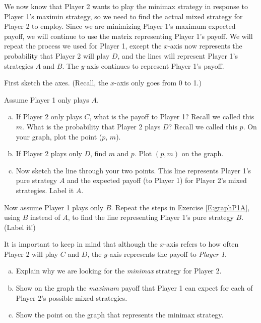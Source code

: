 We now know that Player 2 wants to play the minimax strategy in response to Player 1's maximin strategy, so we need to find the actual mixed strategy for Player 2 to employ. Since we are minimizing Player 1's maximum expected payoff, we will continue to use the matrix representing Player 1's payoff. We will repeat the process we used for Player 1, except the $x$-axis now represents the probability that Player 2 will play $D$, and the lines will represent Player 1's strategies $A$ and $B$. The $y$-axis continues to represent Player 1's payoff. 

\begin{xca}\label{E:graphStep0}
First sketch the axes. (Recall, the $x$-axis only goes from 0 to 1.)
\end{xca}

\begin{xca}\label{E:graphP1A}
Assume Player 1 only plays $A$. 
\begin{enumerate}[(a)]
\item If Player 2 only plays $C$, what is the payoff to Player 1? Recall we called this $m$. What is the probability that Player 2 plays $D$? Recall we called this $p$. On your graph, plot the point ($p$, $m$).

\item If Player 2 plays only $D$, find $m$ and $p$. Plot $(p, m)$ on the graph.

\item Now sketch the line through your two points. This line represents Player 1's pure strategy $A$ and the expected payoff (to Player 1) for Player 2's mixed strategies. Label it $A$.
\end{enumerate}
\end{xca}

\begin{xca}\label{E:graphP1B}
Now assume Player 1 plays only $B$. Repeat the steps in Exercise \ref{E:graphP1A}, using $B$ instead of $A$, to find the line representing Player 1's pure strategy $B$. (Label it!)
\end{xca}

\begin{xca}\label{E:graphminimax} It is important to keep in  mind that although the $x$-axis refers to how often Player 2 will play $C$ and $D$, the $y$-axis represents the payoff to {\it Player 1}. 
\begin{enumerate}[(a)]
\item Explain why we are looking for the \emph{minimax} strategy for Player 2. 
\item Show on the graph the \emph{maximum} payoff that Player 1 can expect for each of Player 2's possible mixed strategies.
\item Show the point on the graph that represents the minimax strategy.
\end{enumerate}
\end{xca}

